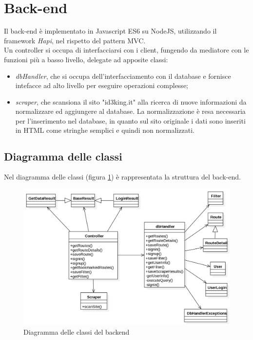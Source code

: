 \documentclass[11pt]{report}
\begin{document}
\section{Back-end}
Il back-end è implementato in Javascript ES6 su NodeJS, utilizzando il framework \textit{Hapi}, nel rispetto del pattern MVC.
\\Un controller si occupa di interfacciarsi con i client, fungendo da mediatore con le funzioni più a basso livello, delegate ad apposite classi:
\begin{itemize}
	\item \textit{dbHandler}, che si occupa dell'interfacciamento con il database e fornisce intefacce ad alto livello per eseguire operazioni complesse;
	\item \textit{scraper}, che scansiona il sito "id3king.it" alla ricerca di nuove informazioni da normalizzare ed aggiungere al database.
	La normalizzazione è resa necessaria per l'inserimento nel database, in quanto sul sito originale i dati sono inseriti in HTML come stringhe semplici e quindi non normalizzati.
\end{itemize}
\subsection{Diagramma delle classi}
Nel diagramma delle classi (figura \ref{class_diagram_backend}) è rappresentata la struttura del back-end.
\begin{figure}
	\centering
	\includegraphics[scale=0.45]{ClassDiagram_Backend}
	\caption{Diagramma delle classi del backend \label{class_diagram_backend}}
\end{figure}
\end{document}
